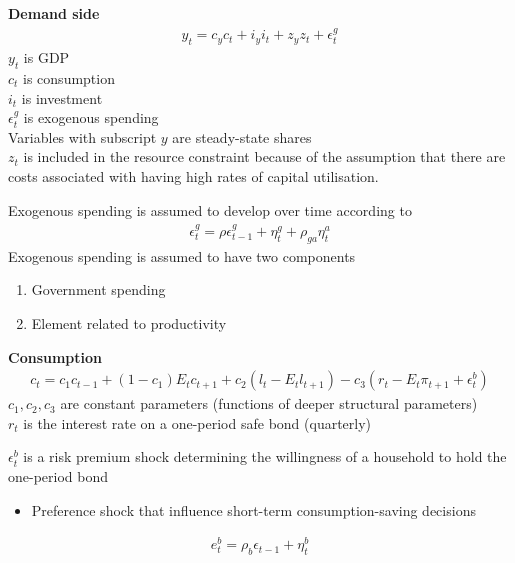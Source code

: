 \documentclass{beamer}
\begin{document}
\begin{frame}
 \textbf{Demand side}  
\begin{align}
  y_t = c_y c_t + i_y i_t + z_y z_t + \epsilon_t^g
\end{align}
$y_t$ is GDP\\
$c_t$ is consumption\\ 
$i_t$ is investment\\
$\epsilon_t^g$ is exogenous spending\\
\medskip
Variables with subscript $y$ are steady-state shares\\
$z_t$ is included in the resource constraint because of the assumption that there are costs associated with having high rates of capital utilisation. 
\end{frame}

\begin{frame}  
Exogenous spending is assumed to develop over time according to
\begin{align}
  \epsilon_t^g = \rho\epsilon_{t-1}^g + \eta_t^g + \rho_{ga}\eta_t^a
\end{align}
Exogenous spending is assumed to have two components
\begin{enumerate}
  \item Government spending
  \item Element related to productivity
\end{enumerate} 
\end{frame}

\begin{frame}
  \textbf{Consumption}  
\begin{align}
  c_t = c_1c_{t-1} + (1-c_1) E_t c_{t+1} + c_2(l_t-E_t l_{t+1}) - c_3(r_t - E_t \pi_{t+1} + \epsilon_t^b)
\end{align}
$c_1, c_2, c_3$ are constant parameters (functions of deeper structural parameters)\\
$r_t$ is the interest rate on a one-period safe bond (quarterly)\\ \medskip

$\epsilon_t^b$ is a risk premium shock determining the willingness of a household to hold the one-period bond
\begin{itemize}
  \item Preference shock that influence short-term consumption-saving decisions
\end{itemize}
\begin{align}
  e_t^b = \rho_b\epsilon_{t-1} + \eta_t^b
\end{align}
\end{frame}
\end{document}
